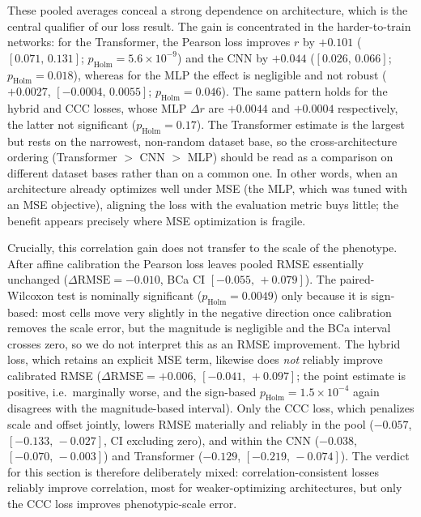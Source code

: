 These pooled averages conceal a strong dependence on architecture, which is the
central qualifier of our loss result. The gain is concentrated in the
harder-to-train networks: for the Transformer, the Pearson loss improves $r$ by
$+0.101$ ($[0.071,\,0.131]$; $p_{\mathrm{Holm}}=5.6\times10^{-9}$) and the CNN by
$+0.044$ ($[0.026,\,0.066]$; $p_{\mathrm{Holm}}=0.018$), whereas for the MLP the
effect is negligible and not robust ($+0.0027$, $[-0.0004,\,0.0055]$;
$p_{\mathrm{Holm}}=0.046$). The same pattern holds for the hybrid and CCC losses,
whose MLP $\Delta r$ are $+0.0044$ and $+0.0004$ respectively, the latter not
significant ($p_{\mathrm{Holm}}=0.17$). The Transformer estimate is the largest
but rests on the narrowest, non-random dataset base, so the cross-architecture
ordering (Transformer $>$ CNN $>$ MLP) should be read as a comparison on
different dataset bases rather than on a common one. In other words, when an
architecture already optimizes well under MSE (the MLP, which was tuned with an
MSE objective), aligning the loss with the evaluation metric buys little; the
benefit appears precisely where MSE optimization is fragile.

Crucially, this correlation gain does not transfer to the scale of the phenotype.
After affine calibration the Pearson loss leaves pooled RMSE essentially unchanged
($\Delta\mathrm{RMSE}=-0.010$, BCa CI $[-0.055,\,+0.079]$). The paired-Wilcoxon
test is nominally significant ($p_{\mathrm{Holm}}=0.0049$) only because it is
sign-based: most cells move very slightly in the negative direction once
calibration removes the scale error, but the magnitude is negligible and the BCa
interval crosses zero, so we do not interpret this as an RMSE improvement. The
hybrid loss, which retains an explicit MSE term, likewise does \emph{not} reliably
improve calibrated RMSE ($\Delta\mathrm{RMSE}=+0.006$, $[-0.041,\,+0.097]$; the
point estimate is positive, i.e.\ marginally worse, and the sign-based
$p_{\mathrm{Holm}}=1.5\times10^{-4}$ again disagrees with the magnitude-based
interval). Only the CCC loss, which penalizes scale and offset jointly, lowers
RMSE materially and reliably in the pool ($-0.057$, $[-0.133,\,-0.027]$, CI
excluding zero), and within the CNN ($-0.038$, $[-0.070,\,-0.003]$) and
Transformer ($-0.129$, $[-0.219,\,-0.074]$). The verdict for this section is
therefore deliberately mixed: correlation-consistent losses reliably improve
correlation, most for weaker-optimizing architectures, but only the CCC loss
improves phenotypic-scale error.

